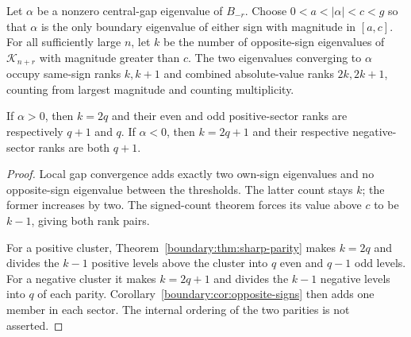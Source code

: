 \begin{corollary}
\label{interaction:cor:relative-cluster-ranks}
Let $\alpha$ be a nonzero central-gap eigenvalue of $B_{-r}$.
Choose $0<a<|\alpha|<c<g$ so that $\alpha$ is the only boundary
eigenvalue of either sign with magnitude in $[a,c]$.
For all sufficiently large $n$, let $k$ be the number of opposite-sign
eigenvalues of $\mathcal K_{n+r}$ with magnitude greater than $c$.
The two eigenvalues converging to $\alpha$ occupy same-sign ranks
$k,k+1$ and combined absolute-value ranks $2k,2k+1$, counting from
largest magnitude and counting multiplicity.

If $\alpha>0$, then $k=2q$ and their even and odd positive-sector ranks
are respectively $q+1$ and $q$. If $\alpha<0$, then $k=2q+1$ and their
respective negative-sector ranks are both $q+1$.
\end{corollary}
\begin{proof}
Local gap convergence adds exactly two own-sign eigenvalues and no
opposite-sign eigenvalue between the thresholds. The latter count stays
$k$; the former increases by two. The signed-count theorem forces its
value above $c$ to be $k-1$, giving both rank pairs.

For a positive cluster, Theorem~\ref{boundary:thm:sharp-parity} makes
$k=2q$ and divides the $k-1$ positive levels above the cluster into
$q$ even and $q-1$ odd levels. For a negative cluster it makes $k=2q+1$
and divides the $k-1$ negative levels into $q$ of each parity.
Corollary~\ref{boundary:cor:opposite-signs} then adds one member in
each sector. The internal ordering of the two parities is not asserted.
\end{proof}



